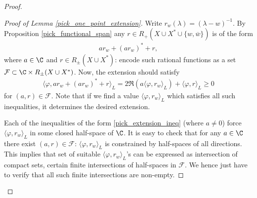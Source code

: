 \begin{proof}
	\begin{proof}[Proof of Lemma \ref{pick_one_point_extension}]
		Write $r_{w}(\lambda) = (\lambda - w)^{-1}$. By Proposition \ref{pick_functional_span} any $r \in R_{+}(X \cup X^{*} \cup \{w, \overline{w}\})$ is of the form
		\begin{align*}
			ar_{w} + (ar_{w})^{*} + r,
		\end{align*}
		where $a \in \C$ and $r \in R_{\pm}(X \cup X^{*})$: encode such rational functions as a set $\mathcal{F} \subset \C \times R_{\pm}(X \cup X^{*})$. Now, the extension should satisfy
		\begin{align}\label{pick_extension_ineq}
			\langle \varphi, ar_{w} + (ar_{w})^{*} + r \rangle_{L} = 2 \Re(a \langle \varphi, r_{w} \rangle_{L}) + \langle \varphi, r\rangle_{L} \geq 0
		\end{align}
		for $(a, r) \in \mathcal{F}$. Note that if we find a value $\langle \varphi, r_{w} \rangle_{L}$ which satisfies all such inequalities, it determines the desired extension.

		Each of the inequalities of the form \ref{pick_extension_ineq} (where $a \neq 0$) force $\langle \varphi, r_{w} \rangle_{L}$ in some closed half-space of $\C$. It is easy to check that for any $a \in \C$ there exist $(a, r) \in \mathcal{F}$: $\langle \varphi, r_{w} \rangle_{L}$ is constrained by half-spaces of all directions. This implies that set of suitable $\langle \varphi, r_{w} \rangle_{L}$'s can be expressed as intersection of compact sets, certain finite intersections of half-spaces in $\mathcal{F}$. We hence just have to verify that all such finite intersections are non-empty.


\end{proof}
\end{proof}
